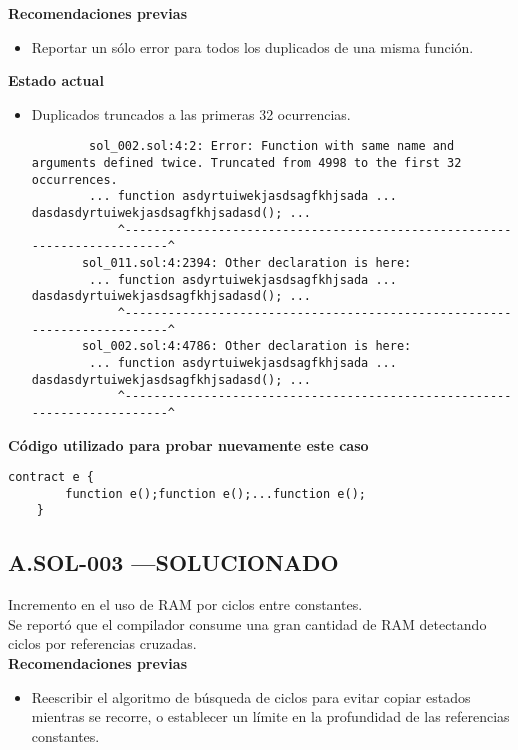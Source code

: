 \textbf{Recomendaciones previas}
\begin{itemize}
    \item Reportar un sólo error para todos los duplicados de una misma función.
\end{itemize}
\bigskip

\textbf{Estado actual}
\begin{itemize}
    \item Duplicados truncados a las primeras 32 ocurrencias.
    \begin{lstlisting}
        sol_002.sol:4:2: Error: Function with same name and arguments defined twice. Truncated from 4998 to the first 32 occurrences.
        ... function asdyrtuiwekjasdsagfkhjsada ... dasdasdyrtuiwekjasdsagfkhjsadasd(); ...
            ^-------------------------------------------------------------------------^    
       sol_011.sol:4:2394: Other declaration is here:
        ... function asdyrtuiwekjasdsagfkhjsada ... dasdasdyrtuiwekjasdsagfkhjsadasd(); ...
            ^-------------------------------------------------------------------------^
       sol_002.sol:4:4786: Other declaration is here:
        ... function asdyrtuiwekjasdsagfkhjsada ... dasdasdyrtuiwekjasdsagfkhjsadasd(); ...
            ^-------------------------------------------------------------------------^   
    \end{lstlisting}
\end{itemize}
\bigskip

\textbf{Código utilizado para probar nuevamente este caso}
\begin{lstlisting}[language=Solidity]
    contract e {
        function e();function e();...function e();
    }    
\end{lstlisting}


\subsection*{A.SOL-003  \color{ForestGreen}—SOLUCIONADO}
Incremento en el uso de RAM por ciclos entre constantes.\\

Se reportó que el compilador consume una gran cantidad de RAM detectando ciclos por referencias cruzadas.\\

\textbf{Recomendaciones previas}
\begin{itemize}
    \item Reescribir el algoritmo de búsqueda de ciclos para evitar copiar estados mientras se recorre, o establecer un límite en la profundidad de las referencias constantes.
\end{itemize}
\bigskip


